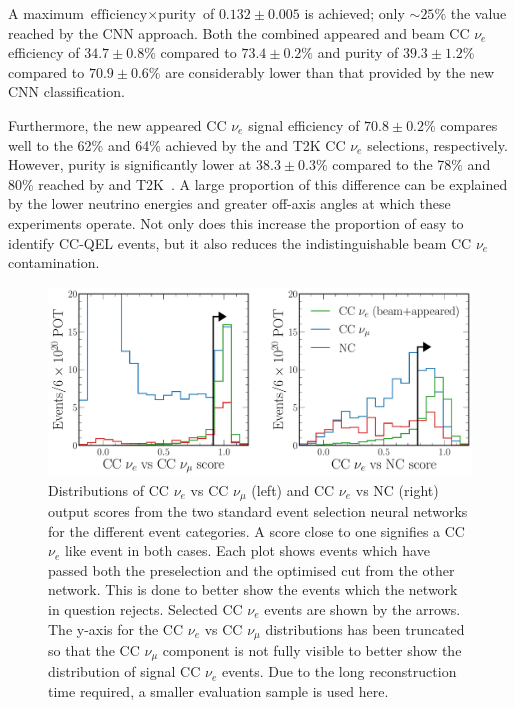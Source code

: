 A maximum $\text{efficiency}\times\text{purity}$ of $0.132\pm0.005$ is achieved; only $\sim25\%$
the value reached by the CNN approach. Both the combined appeared and beam CC $\nu_{e}$ efficiency
of $34.7\pm0.8\%$ compared to $73.4\pm0.2\%$ and purity of $39.3\pm1.2\%$ compared to
$70.9\pm0.6\%$ are considerably lower than that provided by the new CNN classification.

Furthermore, the new appeared CC $\nu_{e}$ signal efficiency of $70.8\pm0.2\%$ compares well to
the 62\% and 64\% achieved by the \nova and T2K CC $\nu_{e}$ selections, respectively. However,
purity is significantly lower at $38.3\pm0.3\%$ compared to the 78\% and 80\% reached by \nova and
T2K~\cite{acero2019, abe2015}. A large proportion of this difference can be explained by the lower
neutrino energies and greater off-axis angles at which these experiments operate. Not only does
this increase the proportion of easy to identify CC-QEL events, but it also reduces the
indistinguishable beam CC $\nu_{e}$ contamination.

\begin{figure} %
    \includegraphics[width=\textwidth]{diagrams/7-results/final_old_pid_outputs.pdf}
    \caption[Distributions of standard event selection neural network output scores]
    {Distributions of CC $\nu_{e}$ vs CC $\nu_{\mu}$ (left) and CC $\nu_{e}$ vs NC (right) output
        scores from the two standard event selection neural networks for the different event
        categories. A score close to one signifies a CC $\nu_{e}$ like event in both cases. Each
        plot shows events which have passed both the preselection and the optimised cut from the
        other network. This is done to better show the events which the network in question
        rejects. Selected CC $\nu_{e}$ events are shown by the arrows. The y-axis for the CC
        $\nu_{e}$ vs CC $\nu_{\mu}$ distributions has been truncated so that the CC $\nu_{\mu}$
        component is not fully visible to better show the distribution of signal CC $\nu_{e}$
        events. Due to the long reconstruction time required, a smaller evaluation sample is used
        here.}
    \label{fig:final_old_pid_outputs}
\end{figure}

